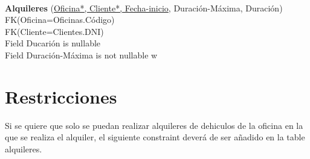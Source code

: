 \documentclass[a4paper,10pt]{article}
\newcommand\tab[1][1cm]{\hspace*{#1}}
\begin{document}
\paragraph{}
{\bf Alquileres} (\underline{Oficina*, Cliente*, Fecha-inicio}, Duración-Máxima, Duración)\\
  \tab FK(Oficina=Oficinas.Código)\\
  \tab FK(Cliente=Clientes.DNI)\\
  \tab Field Ducarión is nullable\\
  \tab Field Duración-Máxima is not nullable
w
\section{Restricciones}
Si se quiere que solo se puedan realizar alquileres de dehiculos de la oficina en la que se realiza el alquiler, el siguiente constraint deverá de ser añadido en la table alquileres.
\begin{scriptsize}
  
\end{scriptsize}
\end{document}
